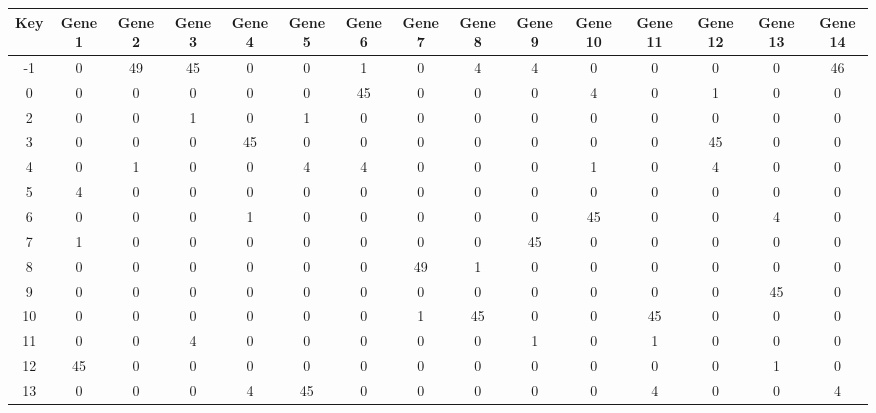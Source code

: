 \begin{tabular}{|c|c|c|c|c|c|c|c|c|c|c|c|c|c|c|}
\hline
Key & Gene 1 & Gene 2 & Gene 3 & Gene 4 & Gene 5 & Gene 6 & Gene 7 & Gene 8 & Gene 9 & Gene 10 & Gene 11 & Gene 12 & Gene 13 & Gene 14 \\
\hline
-1 & 0 & 49 & 45 & 0 & 0 & 1 & 0 & 4 & 4 & 0 & 0 & 0 & 0 & 46 \\
0 & 0 & 0 & 0 & 0 & 0 & 45 & 0 & 0 & 0 & 4 & 0 & 1 & 0 & 0 \\
2 & 0 & 0 & 1 & 0 & 1 & 0 & 0 & 0 & 0 & 0 & 0 & 0 & 0 & 0 \\
3 & 0 & 0 & 0 & 45 & 0 & 0 & 0 & 0 & 0 & 0 & 0 & 45 & 0 & 0 \\
4 & 0 & 1 & 0 & 0 & 4 & 4 & 0 & 0 & 0 & 1 & 0 & 4 & 0 & 0 \\
5 & 4 & 0 & 0 & 0 & 0 & 0 & 0 & 0 & 0 & 0 & 0 & 0 & 0 & 0 \\
6 & 0 & 0 & 0 & 1 & 0 & 0 & 0 & 0 & 0 & 45 & 0 & 0 & 4 & 0 \\
7 & 1 & 0 & 0 & 0 & 0 & 0 & 0 & 0 & 45 & 0 & 0 & 0 & 0 & 0 \\
8 & 0 & 0 & 0 & 0 & 0 & 0 & 49 & 1 & 0 & 0 & 0 & 0 & 0 & 0 \\
9 & 0 & 0 & 0 & 0 & 0 & 0 & 0 & 0 & 0 & 0 & 0 & 0 & 45 & 0 \\
10 & 0 & 0 & 0 & 0 & 0 & 0 & 1 & 45 & 0 & 0 & 45 & 0 & 0 & 0 \\
11 & 0 & 0 & 4 & 0 & 0 & 0 & 0 & 0 & 1 & 0 & 1 & 0 & 0 & 0 \\
12 & 45 & 0 & 0 & 0 & 0 & 0 & 0 & 0 & 0 & 0 & 0 & 0 & 1 & 0 \\
13 & 0 & 0 & 0 & 4 & 45 & 0 & 0 & 0 & 0 & 0 & 4 & 0 & 0 & 4 \\
\hline
\end{tabular}